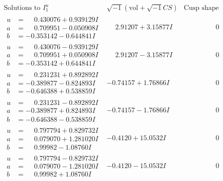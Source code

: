 \documentclass[1p]{elsarticle_modified}
\theoremstyle{definition}
\newcommand{\I}{\sqrt{-1}}
\begin{document}
$$\begin{array}{c|c|c}  
\text{Solutions to }I^u_{1}& \I (\text{vol} + \sqrt{-1}CS) & \text{Cusp shape}\\
 \hline 
\begin{aligned}
u &= \phantom{-}0.430076 + 0.939129 I \\
a &= \phantom{-}0.709951 - 0.050908 I \\
b &= -0.353142 - 0.644841 I\end{aligned}
 & \phantom{-}2.91207 + 3.15877 I & \phantom{-0.000000 } 0 \\ \hline\begin{aligned}
u &= \phantom{-}0.430076 - 0.939129 I \\
a &= \phantom{-}0.709951 + 0.050908 I \\
b &= -0.353142 + 0.644841 I\end{aligned}
 & \phantom{-}2.91207 - 3.15877 I & \phantom{-0.000000 } 0 \\ \hline\begin{aligned}
u &= \phantom{-}0.231231 + 0.892892 I \\
a &= -0.389877 - 0.824893 I \\
b &= -0.646388 + 0.538859 I\end{aligned}
 & -0.74157 + 1.76866 I & \phantom{-0.000000 } 0 \\ \hline\begin{aligned}
u &= \phantom{-}0.231231 - 0.892892 I \\
a &= -0.389877 + 0.824893 I \\
b &= -0.646388 - 0.538859 I\end{aligned}
 & -0.74157 - 1.76866 I & \phantom{-0.000000 } 0 \\ \hline\begin{aligned}
u &= \phantom{-}0.797794 + 0.829732 I \\
a &= \phantom{-}0.079070 + 1.281020 I \\
b &= \phantom{-}0.99982 - 1.08760 I\end{aligned}
 & -0.4120 + 15.0532 I & \phantom{-0.000000 } 0 \\ \hline\begin{aligned}
u &= \phantom{-}0.797794 - 0.829732 I \\
a &= \phantom{-}0.079070 - 1.281020 I \\
b &= \phantom{-}0.99982 + 1.08760 I\end{aligned}
 & -0.4120 - 15.0532 I & \phantom{-0.000000 } 0 \\ \hline\begin{aligned}

\end{aligned}
\end{array}$$
\end{document}
